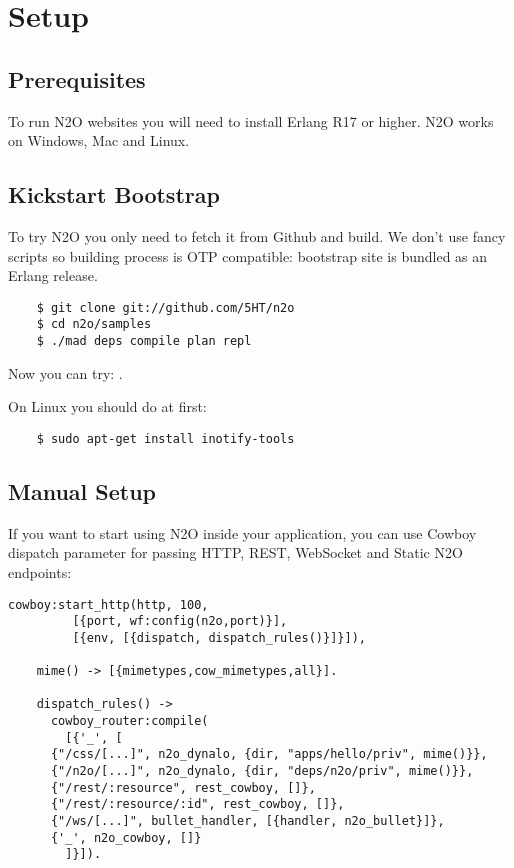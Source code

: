 \section{Setup}

\subsection{Prerequisites}
To run N2O websites you will need to install Erlang R17 or higher.
N2O works on Windows, Mac and Linux.

\subsection{Kickstart Bootstrap}
To try N2O you only need to fetch it from Github and build. We don't use
fancy scripts so building process is OTP compatible: bootstrap site
is bundled as an Erlang release.

\vspace{1\baselineskip}
\begin{lstlisting}
    $ git clone git://github.com/5HT/n2o
    $ cd n2o/samples
    $ ./mad deps compile plan repl
\end{lstlisting}
\vspace{1\baselineskip}

Now you can try: .

On Linux you should do at first:

\begin{lstlisting}
    $ sudo apt-get install inotify-tools
\end{lstlisting}

\newpage
\subsection{Manual Setup}
If you want to start using N2O inside your application, you can use Cowboy dispatch parameter
for passing HTTP, REST, WebSocket and Static N2O endpoints:

\begin{lstlisting}[caption=web\_sup.erl]
    cowboy:start_http(http, 100, 
         [{port, wf:config(n2o,port)}],
         [{env, [{dispatch, dispatch_rules()}]}]),

    mime() -> [{mimetypes,cow_mimetypes,all}].

    dispatch_rules() ->
      cowboy_router:compile(
        [{'_', [
      {"/css/[...]", n2o_dynalo, {dir, "apps/hello/priv", mime()}},
      {"/n2o/[...]", n2o_dynalo, {dir, "deps/n2o/priv", mime()}},
      {"/rest/:resource", rest_cowboy, []},
      {"/rest/:resource/:id", rest_cowboy, []},
      {"/ws/[...]", bullet_handler, [{handler, n2o_bullet}]},
      {'_', n2o_cowboy, []}
        ]}]).
\end{lstlisting}
\vspace{1\baselineskip}

